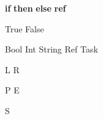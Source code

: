 


\newoperator{\If}
  {\textbf{if}}
\newoperator{\Then}
  {\textbf{then}}
\newoperator{\Else}
  {\textbf{else}}
\newoperator{\Ref}
  {\textbf{ref}}



\newoperator{\True}
  {\textsf{True}}
\newoperator{\False}
  {\textsf{False}}

\newcommand*{\astring}[1]
  {\textit{``#1''}}



\newoperator{\Bool}
  {\textsf{Bool}}
\newoperator{\Int}
  {\textsf{Int}}
\newoperator{\String}
  {\textsf{String}}
\newoperator{\Reference}
  {\textsf{Ref}}
\newoperator{\Task}
  {\textsf{Task}}



\newoperator{\Seq}
  {\vartriangleright}
\newoperator{\Cont}
  {\blacktriangleright}
\let\And\relax
\newoperator{\And}
  {\otimes}
\newoperator{\Or}
  {\oplus}
\newoperator{\Edit}
  {\square}
\newoperator{\Empty}
  {\boxtimes}
\newoperator{\Watch}
  {\blacksquare}
\newoperator{\Fail}
  {\circlearrowleft}



\newoperator{\Left}
  {\textsf{L}}
\newoperator{\Right}
  {\textsf{R}}

\newcommand*{\Clear}
  {\textsf{C}}
\newcommand*{\Next}
  {\textsf{N}}
\newoperator{\Pick}
  {\textsf{P}}
\newoperator{\Execute}
  {\textsf{E}}


\newcommand*{\First}
  {\textsf{F}}
\newcommand*{\Second}
  {\textsf{S}}
\newoperator{\Other}
  {\textsf{S}}



\newcommand*{\downto}
  {\Downarrow}
\newcommand*{\normalise}
  {\;\rightarrow\!\shortmid\;}
\newcommand*{\handle}[1]
  {\;\xrightarrow{\;#1\;}\;}

\newcommand*{\Value}
  {\mathcal{V}}
